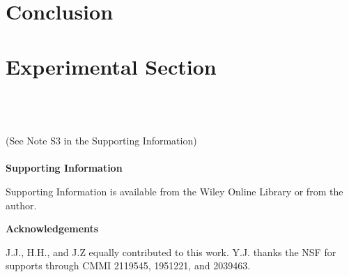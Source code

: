 \documentclass{WileyMSP-template}
\begin{document}
\section{Conclusion}


\section{Experimental Section}
\\
\\
\\
(See Note S3 in the Supporting Information)\\
\\


\medskip
\textbf{Supporting Information} \par %
Supporting Information is available from the Wiley Online Library or from the author.



\medskip
\textbf{Acknowledgements} \par %
J.J., H.H., and J.Z equally contributed to this work. Y.J. thanks the NSF for supports through CMMI 2119545, 1951221, and 2039463.

\medskip

%








\end{document}
